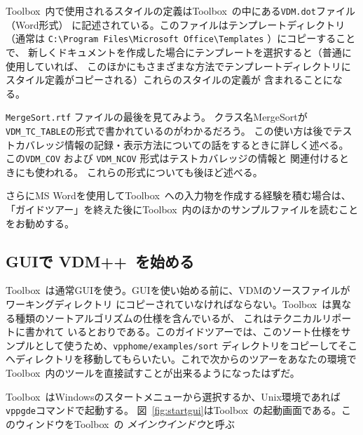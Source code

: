 \documentclass[\pformat,12pt]{jarticle}
\newcommand{\vdmslpp}{VDM++}
\newcommand{\Toolbox}{Toolbox}
\newcommand{\vdmgde}{vppgde}
\newcommand{\vdmhome}{vpphome}
\begin{document}
\Toolbox\ 内で使用されるスタイルの定義は\Toolbox\ の中にある{\tt VDM.dot}ファイル（Word形式）
に記述されている。このファイルはテンプレートディレクトリ（通常は
\verb+C:\Program Files\Microsoft Office\Templates+ ）にコピーすることで、
新しくドキュメントを作成した場合にテンプレートを選択すると（普通に使用していれば、
このほかにもさまざまな方法でテンプレートディレクトリにスタイル定義がコピーされる）これらのスタイルの定義が
含まれることになる。

%
{{\tt MergeSort.rtf} ファイル}の最後を見てみよう。
クラス名MergeSortが\texttt{VDM\_TC\_TABLE}の形式で書かれているのがわかるだろう。
この使い方は後でテストカバレッジ情報の記録・表示方法についての話をするときに詳しく述べる。
この\texttt{VDM\_COV} および \texttt{VDM\_NCOV} 形式はテストカバレッジの情報と
関連付けるときにも使われる。
これらの形式についても後ほど述べる。

さらにMS Wordを使用して\Toolbox\ への入力物を作成する経験を積む場合は、
「ガイドツアー」を終えた後に\Toolbox\ 内のほかのサンプルファイルを読むことをお勧めする。

\subsection{GUIで \vdmslpp\ を始める} 


\Toolbox\ は通常GUIを使う。GUIを使い始める前に、VDMのソースファイルがワーキングディレクトリ
にコピーされていなければならない。\Toolbox\ は異なる種類のソートアルゴリズムの仕様を含んでいるが、
これはテクニカルリポートに書かれて
いるとおりである。このガイドツアーでは、このソート仕様をサンプルとして使うため、{\tt \vdmhome/examples/sort}
ディレクトリをコピーしてそこへディレクトリを移動してもらいたい。これで次からのツアーをあなたの環境で
\Toolbox\ 内のツールを直接試すことが出来るようになったはずだ。

\Toolbox\ はWindowsのスタートメニューから選択するか、Unix環境であれば{\tt
  \vdmgde}コマンドで起動する。
図~\ref{fig:startgui}は\Toolbox\ の起動画面である。このウィンドウを\Toolbox\ の
{\em メインウインドウ\/}と呼ぶ
\end{document}
